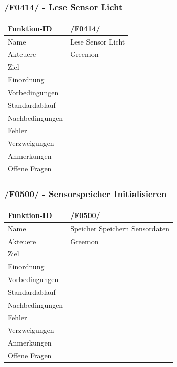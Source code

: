\documentclass[pointlessnumbers]{scrartcl}
\begin{document}
 \subsubsection{/F0414/ - Lese Sensor Licht}
 \begin{tabular}{|p{\BreiteErsterTab}|p{\BreiteZweiterTab}|}\hline
    Funktion-ID &       /F0414/  
                        \\ \hline
    Name &              Lese Sensor Licht
                        \\ \hline
    Akteuere &          Greemon
                        \\ \hline
    Ziel &             
                        \\ \hline
    Einordnung &        
                        \\ \hline
    Vorbedingungen &    
                        \\ \hline
    Standardablauf &    
                        \\ \hline
    Nachbedingungen &   
                        \\ \hline
    Fehler &       
                        \\ \hline
    Verzweigungen &     
                        \\ \hline
    Anmerkungen &       
                        \\ \hline
    Offene Fragen &     
                        \\ \hline
 \end{tabular} 
 
 \subsubsection{/F0500/ - Sensorspeicher Initialisieren}
 \begin{tabular}{|p{\BreiteErsterTab}|p{\BreiteZweiterTab}|}\hline
    Funktion-ID &       /F0500/  
                        \\ \hline
    Name &              Speicher Speichern Sensordaten
                        \\ \hline
    Akteuere &          Greemon
                        \\ \hline
    Ziel &             
                        \\ \hline
    Einordnung &        
                        \\ \hline
    Vorbedingungen &    
                        \\ \hline
    Standardablauf &    
                        \\ \hline
    Nachbedingungen &   
                        \\ \hline
    Fehler &       
                        \\ \hline
    Verzweigungen &     
                        \\ \hline
    Anmerkungen &       
                        \\ \hline
    Offene Fragen &     
                        \\ \hline
 \end{tabular}  
 
\end{document}
